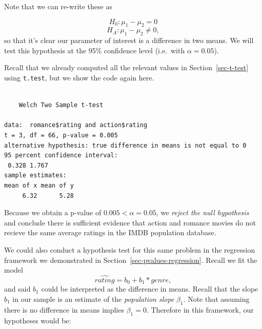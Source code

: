 \documentclass[
  letterpaper,
  DIV=11,
  numbers=noendperiod]{scrreprt}
\newenvironment{Shaded}{\begin{snugshade}}{\end{snugshade}}
\newcommand{\AttributeTok}[1]{\textcolor[rgb]{0.40,0.45,0.13}{#1}}
\newcommand{\FunctionTok}[1]{\textcolor[rgb]{0.28,0.35,0.67}{#1}}
\newcommand{\NormalTok}[1]{\textcolor[rgb]{0.00,0.23,0.31}{#1}}
\newcommand{\OtherTok}[1]{\textcolor[rgb]{0.00,0.23,0.31}{#1}}
\newcommand{\SpecialCharTok}[1]{\textcolor[rgb]{0.37,0.37,0.37}{#1}}
\newcommand{\StringTok}[1]{\textcolor[rgb]{0.13,0.47,0.30}{#1}}
\theoremstyle{definition}
\theoremstyle{remark}
\begin{document}
Note that we can re-write these as

\[H_0: \mu_1 - \mu_2 = 0\] \[H_A: \mu_1 - \mu_2 \neq 0,\] so that it's
clear our parameter of interest is a difference in two means. We will
test this hypothesis at the 95\% confidence level (i.e.~with
\(\alpha = 0.05\)).

Recall that we already computed all the relevant values in
Section~\ref{sec-t-test} using \texttt{t.test}, but we show the code
again here.

\begin{Shaded}
\end{Shaded}

\begin{verbatim}

    Welch Two Sample t-test

data:  romance$rating and action$rating
t = 3, df = 66, p-value = 0.005
alternative hypothesis: true difference in means is not equal to 0
95 percent confidence interval:
 0.328 1.767
sample estimates:
mean of x mean of y 
     6.32      5.28 
\end{verbatim}

Because we obtain a p-value of \(0.005 < \alpha = 0.05\), we
\emph{reject the null hypothesis} and conclude there is sufficient
evidence that action and romance movies do not recieve the same average
ratings in the IMDB population database.

We could also conduct a hypothesis test for this same problem in the
regression framework we demonstrated in
Section~\ref{sec-pvalues-regression}. Recall we fit the model
\[\widehat{rating} = b_0 + b_1*genre,\] and said \(b_1\) could be
interpreted as the difference in means. Recall that the slope \(b_1\) in
our sample is an estimate of the \emph{population slope} \(\beta_1\).
Note that assuming there is no difference in means implies
\(\beta_1 = 0\). Therefore in this framework, our hypotheses would be:
\end{document}
